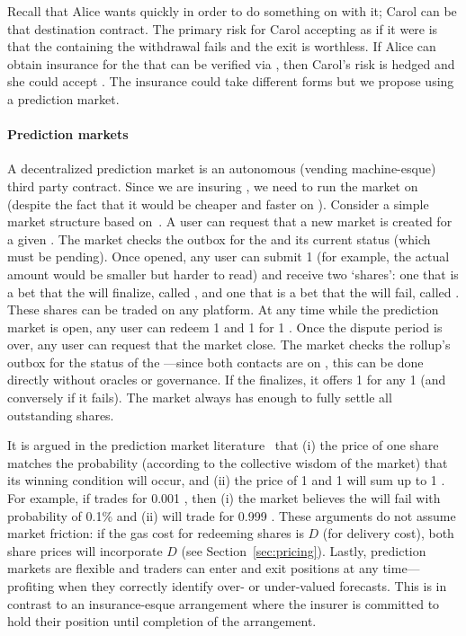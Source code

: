 Recall that Alice wants \ethone quickly in order to do something on \layerone with it; Carol can be that destination contract. The primary risk for Carol accepting \ethxx as if it were \ethone is that the \rblock containing the \ethxx withdrawal fails and the exit is worthless. If Alice can obtain insurance for the \ethxx that can be verified via \layerone, then Carol's risk is hedged and she could accept \ethxx. The insurance could take different forms but we propose using a prediction market.

\paragraph*{Prediction markets} A decentralized prediction market is an autonomous (\eg vending machine-esque) third party contract. Since we are insuring \layerone \ethxx, we need to run the market on \layerone (despite the fact that it would be cheaper and faster on \layertwo). Consider a simple market structure based on~\cite{clark2014decentralizing}. A user can request that a new market is created for a given \rblock. The market checks the outbox for the \rblock and its current status (which must be pending). Once opened, any user can submit 1 \ethone (for example, the actual amount would be smaller but harder to read) and receive two `shares': one that is a bet that the \rblock will finalize, called \final, and one that is a bet that the \rblock will fail, called \fail. These shares can be traded on any platform. At any time while the prediction market is open, any user can redeem 1 \final and 1 \fail for 1 \ethone. Once the dispute period is over, any user can request that the market close. The market checks the rollup's outbox for the status of the \rblock---since both contacts are on \layerone, this can be done directly without oracles or governance. If the \rblock finalizes, it offers 1 \ethone for any 1 \final (and conversely if it fails). The market always has enough \ethone to fully settle all outstanding shares.

It is argued in the prediction market literature~\cite{clark2014decentralizing} that (i) the price of one share matches the probability (according to the collective wisdom of the market) that its winning condition will occur, and (ii) the price of 1 \final and 1 \fail will sum up to 1 \ethone. For example, if \fail trades for 0.001 \ethone, then (i) the market believes the \rblock will fail with probability of 0.1\% and (ii) \final will trade for  0.999 \ethone. These arguments do not assume market friction: if the gas cost for redeeming shares is $D$ (for delivery cost), both share prices will incorporate $D$ (see Section~\ref{sec:pricing}). Lastly, prediction markets are flexible and traders can enter and exit positions at any time---profiting when they correctly identify over- or under-valued forecasts. This is in contrast to an insurance-esque arrangement where the insurer is committed to hold their position until completion of the arrangement.



